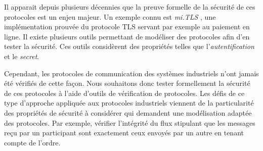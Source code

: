 \documentclass{article}
\begin{document}
Il apparait depuis plusieurs décennies que la preuve formelle de
la sécurité de ces protocoles est un enjeu majeur.
Un exemple connu est {\em mi.TLS} \cite{BFKPS13}, une implémentation prouvée
du protocole TLS \cite{DR08} servant par exemple au paiement en ligne.
Il existe plusieurs outils permettant de modéliser des protocoles afin d'en
tester la sécurité.
Ces outils considèrent des propriétés telles que l'{\em autentification}
et le {\em secret}.

Cependant, les protocoles de communication des systèmes industriels n'ont jamais
été vérifiés de cette façon.
Nous souhaitons donc tester formellement la sécurité de ces protocoles à l'aide
d'outils de vérification de protocoles.
Les défis de ce type d'approche appliquée aux protocoles industriels viennent
de la particularité des propriétés de sécurité à considérer qui demandent une
modélisation adaptée des protocoles.
Par exemple, vérifier l'intégrité du flux stipulant que les messages reçu par
un participant sont exactement ceux envoyés par un autre en tenant compte de
l'ordre.
\end{document}
